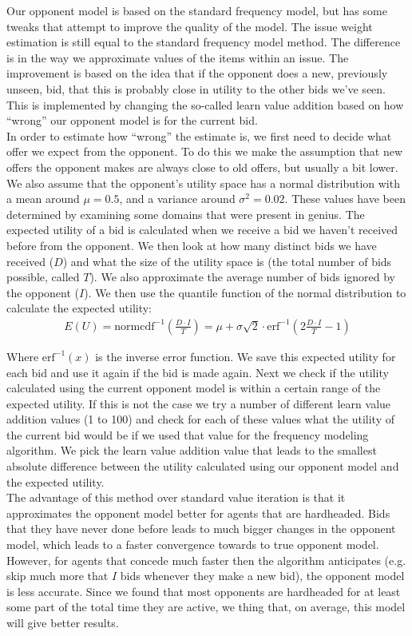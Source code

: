 Our opponent model is based on the standard frequency model, but has some tweaks that attempt to improve the quality of the model. The issue weight estimation is still equal to the standard frequency model method. The difference is in the way we approximate values of the items within an issue. The improvement is based on the idea that if the opponent does a new, previously unseen, bid, that this is probably close in utility to the other bids we've seen. This is implemented by changing the so-called learn value addition based on how ``wrong'' our opponent model is for the current bid. \\

In order to estimate how ``wrong'' the estimate is, we first need to decide what offer we expect from the opponent. To do this we make the assumption that new offers the opponent makes are always close to old offers, but usually a bit lower. We also assume that the opponent's utility space has a normal distribution with a mean around $\mu = 0.5$, and a variance around $\sigma^2 = 0.02$. These values have been determined by examining some domains that were present in genius. The expected utility of a bid is calculated when we receive a bid we haven't received before from the opponent. We then look at how many distinct bids we have received ($D$) and what the size of the utility space is (the total number of bids possible, called $T$). We also approximate the average number of bids ignored by the opponent ($I$). We then use the quantile function of the normal distribution to calculate the expected utility:
\begin{align}
  E(U) = \text{normcdf}^{-1} \left(\frac{D \cdot I}{T}\right) = \mu + \sigma \sqrt{2} \cdot \text{erf}^{-1} \left(2 \frac{D \cdot I}{T} - 1\right)
\end{align}

Where $\text{erf}^{-1}(x)$ is the inverse error function. We save this expected utility for each bid and use it again if the bid is made again. Next we check if the utility calculated using the current opponent model is within a certain range of the expected utility. If this is not the case we try a number of different learn value addition values (1 to 100) and check for each of these values what the utility of the current bid would be if we used that value for the frequency modeling algorithm. We pick the learn value addition value that leads to the smallest absolute difference between the utility calculated using our opponent model and the expected utility. \\

The advantage of this method over standard value iteration is that it approximates the opponent model better for agents that are hardheaded. Bids that they have never done before leads to much bigger changes in the opponent model, which leads to a faster convergence towards to true opponent model. However, for agents that concede much faster then the algorithm anticipates (e.g. skip much more that $I$ bids whenever they make a new bid), the opponent model is less accurate. Since we found that most opponents are hardheaded for at least some part of the total time they are active, we thing that, on average, this model will give better results.